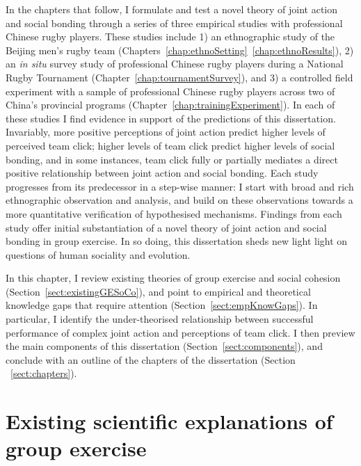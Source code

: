 \begin{CJK}{UTF8}{gbsn}
In the chapters that follow, I formulate and test a novel theory of joint action and social bonding through a series of three empirical studies with professional Chinese rugby players.  These studies include 1) an ethnographic study of the Beijing men's rugby team (Chapters~\ref{chap:ethnoSetting}\nobreakdash~\ref{chap:ethnoResults}), 2) an \textit{in situ} survey study of professional Chinese rugby players during a National Rugby Tournament (Chapter~\ref{chap:tournamentSurvey}), and 3) a controlled field experiment with a sample of professional Chinese rugby players across two of China's provincial programs (Chapter~\ref{chap:trainingExperiment}).  In each of these studies I find evidence in support of the predictions of this dissertation.  Invariably, more positive perceptions of joint action predict higher levels of perceived team click; higher levels of team click predict higher levels of social bonding, and in some instances, team click fully or partially mediates a direct positive relationship between  joint action and social bonding.  Each study progresses from its predecessor in a step-wise manner: I start with broad and rich ethnographic observation and analysis, and build on these observations towards a more quantitative verification of hypothesised mechanisms.  Findings from each study offer initial substantiation of a novel theory of joint action and social bonding in group exercise.  In so doing, this dissertation sheds new light light on questions of human sociality and evolution.

In this chapter, I review existing theories of group exercise and social cohesion (Section~\ref{sect:existingGESoCo}), and point to empirical and theoretical knowledge gaps that require attention (Section~\ref{sect:empKnowGaps}).  In particular, I identify the under-theorised relationship between successful performance of complex joint action and perceptions of team click.  I then preview the main components of this dissertation (Section~\ref{sect:components}), and conclude with an outline of the chapters of the dissertation (Section ~\ref{sect:chapters}).


\section{Existing scientific explanations of group exercise\label{sect:GESoCo}}


\end{CJK}
